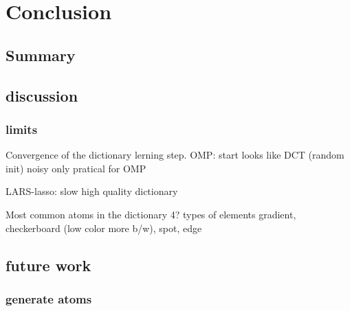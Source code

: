 \chapter{Conclusion}
\section{Summary} %

\section{discussion}
\subsection{limits}
Convergence of the dictionary lerning step.
OMP:
  start looks like DCT (random init)
  noisy
  only pratical for OMP

LARS-lasso:
  slow 
  high quality dictionary

  Most common atoms in the dictionary 
  4? types of elements
  gradient, checkerboard (low color more b/w), spot, edge

\section{future work}
\subsection{generate atoms}
